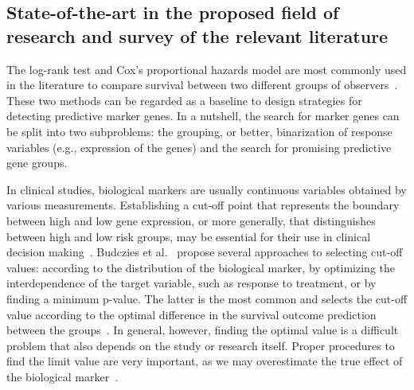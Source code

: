 \documentclass[11pt,a4paper]{article}
\begin{document}


\subsection{State-of-the-art in the proposed field of research and survey of the relevant literature}

The log-rank test and Cox's proportional hazards model are most commonly used in the literature to compare survival between two different groups of observers~\cite{singh2011survival}. These two methods can be regarded as a baseline to design strategies for detecting predictive marker genes. In a nutshell, the search for marker genes can be split into two subproblems: the grouping, or better, binarization of response variables (e.g., expression of the genes) and the search for promising predictive gene groups.

In clinical studies, biological markers are usually continuous variables obtained by various measurements. Establishing a cut-off point that represents the boundary between high and low gene expression, or more generally, that distinguishes between high and low risk groups, may be essential for their use in clinical decision making~\cite{mazumdar2000categorizing}. Budczies et al.~\cite{budczies2012cutoff} propose several approaches to selecting cut-off values: according to the distribution of the biological marker, by optimizing the interdependence of the target variable, such as response to treatment, or by finding a minimum p-value. The latter is the most common and selects the cut-off value according to the optimal difference in the survival outcome prediction between the groups~\cite{woo2020determination}. In general, however, finding the optimal value is a difficult problem that also depends on the study or research itself. Proper procedures to find the limit value are very important, as we may overestimate the true effect of the biological marker~\cite{Altman1991}.
\end{document}
